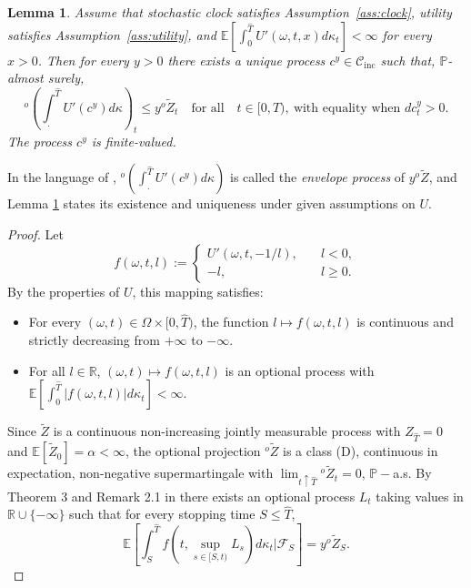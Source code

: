 \documentclass[11pt, oneside]{article}   	%
\theoremstyle{plain}
\newtheorem{lem}[thm]{Lemma}
\theoremstyle{definition}
\theoremstyle{remark}
\begin{document}
\begin{appendix}
\begin{lem}\label{lem:envelope}
Assume that stochastic clock satisfies Assumption~\ref{ass:clock}, utility satisfies Assumption~\ref{ass:utility}, and $\mathbb{E}\left[\int_0^{\hat{T}}U'(\omega,t,x)d\kappa_t\right]<\infty$ for every $x>0$. Then for every $y>0$ there exists a unique process $c^y\in\mathcal{C}_{\text{inc}}$ such that, $\mathbb{P}$-almost surely,
\begin{equation}\label{eq:envelope2}
^o\left(\int_.^{\hat{T}} U'(c^y) d\kappa\right)_t\leq y{}^o\tilde{Z}_t\quad\text{for all}\quad t\in[0,\hat{T}),\ \text{with equality when } dc^y_t>0.
\end{equation}
The process $c^y$ is finite-valued.
\end{lem}
In the language of \cite{BK}, $^o\left(\int_.^{\hat{T}} U'(c^y) d\kappa\right)$ is called the \textit{envelope process} of $y{}^o\tilde{Z}$, and Lemma \ref{lem:envelope} states its existence and uniqueness under given assumptions on $U$.
\begin{proof}
Let $$f(\omega,t,l):=\begin{cases}U'(\omega,t,-1/l),&\quad l<0,\\
-l,&\quad l\geq0.\end{cases}$$
By the properties of $U$, this mapping satisfies:
\begin{itemize}
\item For every $(\omega,t)\in\Omega\times[0,\hat{T})$, the function $l\mapsto f(\omega,t,l)$ is continuous and strictly decreasing from $+\infty$ to $-\infty$.
\item For all $l\in\mathbb{R}$, $(\omega,t)\mapsto f(\omega,t,l)$ is an optional process with $\mathbb{E}\left[\int_0^{\hat{T}}\vert f(\omega,t,l)\vert d\kappa_t\right]<\infty$.
\end{itemize}
Since $\tilde{Z}$ is a continuous non-increasing jointly measurable process with $Z_{\hat{T}}=0$ and $\mathbb{E}[\tilde{Z}_0]=\alpha<\infty$, the optional projection ${}^o\tilde{Z}$ is a class (D), continuous in expectation, non-negative supermartingale with $\lim_{t\uparrow \hat{T}}{}^o\tilde{Z}_{t}=0$, $\mathbb{P}-$a.s.
By Theorem 3 and Remark 2.1 in \cite{bank-el-karoui} there exists an optional process $L_t$ taking values in $\mathbb{R}\cup\{-\infty\}$ such that for every stopping time $S\leq\hat{T}$,
\begin{equation}\label{eq:repr-formula2}
\mathbb{E}\left[\int_S^{\hat{T}} f(t,\sup_{s\in[S,t)}L_s)d\kappa_t\Big\vert \mathcal{F}_S\right]=y{}^o\tilde{Z}_S.
\end{equation}

\end{proof}
\end{appendix}
\end{document}
